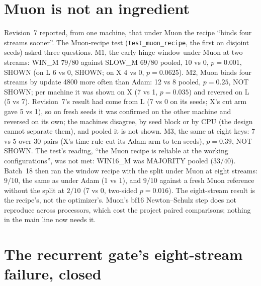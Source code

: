 \documentclass[11pt]{article}
\newcommand{\arm}[1]{\textsf{#1}}
\begin{document}
\section{Muon is not an ingredient}
\label{sec:muon}

Revision~7 reported, from one machine, that under Muon the recipe ``binds four streams sooner''. The Muon-recipe test (\texttt{test\_muon\_recipe}, the first on disjoint seeds) asked three questions. M1, the early hinge window under Muon at two streams: \arm{WIN\_M} $79/80$ against \arm{SLOW\_M} $69/80$ pooled, 10 vs 0, $p = 0.001$, SHOWN (on L 6 vs 0, SHOWN; on X 4 vs 0, $p = 0.0625$). M2, Muon binds four streams by update 4800 more often than Adam: 12 vs 8 pooled, $p = 0.25$, NOT SHOWN; per machine it was shown on X (7 vs 1, $p = 0.035$) and reversed on L (5 vs 7). Revision~7's result had come from L (7 vs 0 on its seeds; X's cut arm gave 5 vs 1), so on fresh seeds it was confirmed on the other machine and reversed on its own; the machines disagree, by seed block or by CPU (the design cannot separate them), and pooled it is not shown. M3, the same at eight keys: 7 vs 5 over 30 pairs (X's time rule cut its Adam arm to ten seeds), $p = 0.39$, NOT SHOWN. The test's reading, ``the Muon recipe is reliable at the working configurations'', was not met: \arm{WIN16\_M} was MAJORITY pooled ($33/40$). Batch~18 then ran the window recipe with the split under Muon at eight streams: $9/10$, the same as under Adam (1 vs 1), and $9/10$ against a fresh Muon reference without the split at $2/10$ (7 vs 0, two-sided $p = 0.016$). The eight-stream result is the recipe's, not the optimizer's. Muon's bf16 Newton--Schulz step does not reproduce across processors, which cost the project paired comparisons; nothing in the main line now needs it.

\section{The recurrent gate's eight-stream failure, closed}
\label{sec:recurrent}
\end{document}

